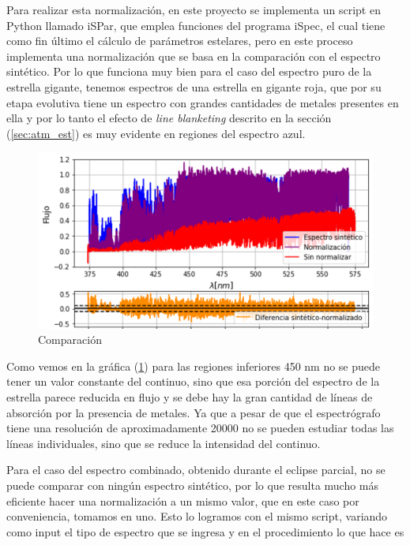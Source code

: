 \documentclass[12pt,oneside,openany,letter]{book}
\begin{document}
Para realizar esta normalización, en este proyecto se implementa un script en Python llamado iSPar, que emplea funciones del programa iSpec, el cual tiene como fin último el cálculo de parámetros estelares, pero en este proceso implementa una normalización que se basa en la comparación con el espectro sintético. Por lo que funciona muy bien para el caso del espectro puro de la estrella gigante, tenemos espectros de una estrella en gigante roja, que por su etapa evolutiva tiene un espectro con grandes cantidades de metales presentes en ella y por lo tanto el efecto de \textit{line blanketing} descrito en la sección (\ref{sec:atm_est}) es muy evidente en regiones del espectro azul.

\begin{figure}
    \centering
    \includegraphics[width=1\linewidth]{Gaficas/comparacion_normalizacion.png}
    \caption{Comparación }
    \label{fig:normalizacion}
\end{figure}

Como vemos en la gráfica (\ref{fig:normalizacion}) para las regiones inferiores 450 nm no se puede tener un valor constante del continuo, sino que esa porción del espectro de la estrella parece reducida en flujo y se debe hay la gran cantidad de líneas de absorción por la presencia de metales. Ya que a pesar de que el espectrógrafo tiene una resolución de aproximadamente 20000 no se pueden estudiar todas las líneas individuales, sino que se reduce la intensidad del continuo.

Para el caso del espectro combinado, obtenido durante el eclipse parcial, no se puede comparar con ningún espectro sintético, por lo que resulta mucho más eficiente hacer una normalización a un mismo valor, que en este caso por conveniencia, tomamos en uno. Esto lo logramos con el mismo script, variando como input el tipo de espectro que se ingresa y en el procedimiento lo que hace es %
\end{document}

